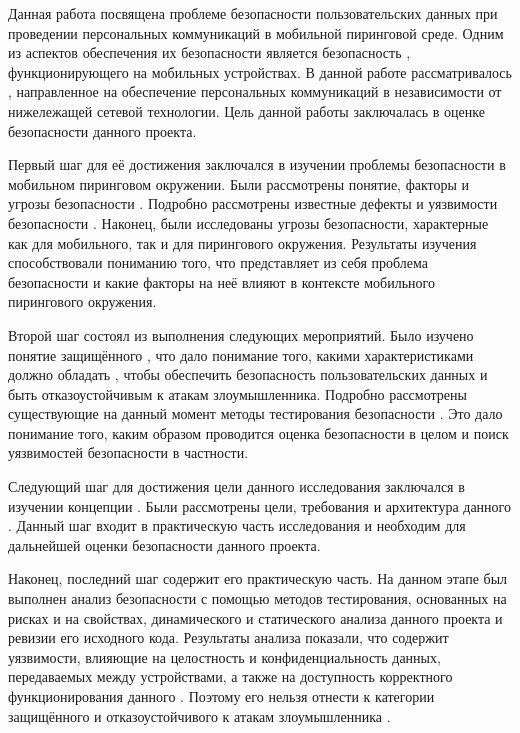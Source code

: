 %
%
%
Данная работа посвящена проблеме безопасности пользовательских данных при проведении персональных коммуникаций в мобильной пиринговой среде. 
%
Одним из аспектов обеспечения их безопасности является безопасность , функционирующего на мобильных устройствах. 
%
В данной работе рассматривалось  , направленное на обеспечение персональных коммуникаций в независимости от нижележащей сетевой технологии. 
%
Цель данной работы заключалась в оценке безопасности данного проекта. 

%
Первый шаг для её достижения заключался в изучении проблемы безопасности  в мобильном пиринговом окружении. 
%
Были рассмотрены понятие, факторы и угрозы безопасности . 
%
Подробно рассмотрены известные дефекты и уязвимости безопасности . 
%
Наконец, были исследованы угрозы безопасности, характерные как для мобильного, так и для пирингового окружения. 
%
Результаты изучения способствовали пониманию того, что представляет из себя проблема безопасности  и какие факторы на неё влияют в контексте мобильного пирингового окружения. 

%
Второй шаг состоял из выполнения следующих мероприятий. 
%
Было изучено понятие защищённого , что дало понимание того, какими характеристиками должно обладать , чтобы обеспечить безопасность пользовательских данных и быть отказоустойчивым к атакам злоумышленника. 
%
Подробно рассмотрены существующие на данный момент методы тестирования безопасности . 
%
Это дало понимание того, каким образом проводится оценка безопасности  в целом и поиск уязвимостей безопасности в частности. 

%
Следующий шаг для достижения цели данного исследования заключался в изучении концепции . 
%
Были рассмотрены цели, требования и архитектура данного . 
%
Данный шаг входит в практическую часть исследования и необходим для дальнейшей оценки безопасности данного проекта. 

%
Наконец, последний шаг содержит его практическую часть. 
%
На данном этапе был выполнен анализ безопасности  с помощью методов тестирования, основанных на рисках и на свойствах, динамического и статического анализа данного проекта и ревизии его исходного кода. 
%
Результаты анализа показали, что  содержит уязвимости, влияющие на целостность и конфиденциальность данных, передаваемых между устройствами, а также на доступность корректного функционирования данного . 
%
Поэтому его нельзя отнести к категории защищённого и отказоустойчивого к атакам злоумышленника . 

